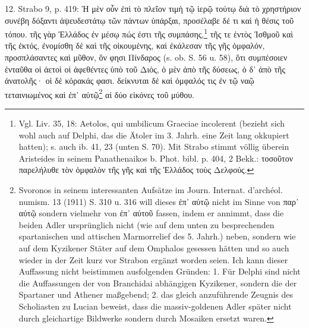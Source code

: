 \documentclass[a4paper, 11pt, oneside]{article}
\begin{document}
12. Strabo 9, p. 419: Ἡ μὲν οὖν ἐπὶ τὸ πλεῖον τιμὴ τῷ ἱερῷ τούτῳ διὰ τὸ χρηστήριον συνέβη δόξαντι ἀψευδεστάτῳ τῶν πάντων ὑπάρξαι, προσέλαβε δέ τι καὶ ἡ θέσις τοῦ τόπου. τῆς γὰρ Ἑλλάδος ἐν μέσῳ πώς ἐστι τῆς συμπάσης,\footnote{Vgl. Liv. 35, 18: Aetolos, qui umbilicum Graeciae incolerent (bezieht sich wohl auch auf Delphi, das die Ätoler im 3. Jahrh. eine Zeit lang okkupiert hatten); s. auch ib. 41, 23 (unten S. 70). Mit Strabo stimmt völlig überein Aristeides in seinem Panathenaikos b. Phot. bibl. p. 404, 2 Bekk.: τοσοῦτον παρελήλυθε τὸν ὀμφαλὸν τῆς γῆς καὶ τῆς Ἑλλάδος τοὺς Δελφούς.} τῆς τε ἐντὸς Ἰσθμοῦ καὶ τῆς ἐκτός, ἐνομίσθη δὲ καὶ τῆς οἰκουμένης, καὶ ἐκάλεσαν τῆς γῆς ὀμφαλόν, προσπλάσαντες καὶ μῦθον, ὃν φησι Πίνδαρος (s. ob. S. 56 u. 58), ὅτι συμπέσοιεν ἐνταῦθα οἱ ἀετοὶ οἱ ἀφεθέντες ὑπὸ τοῦ Διός, ὁ μὲν ἀπὸ τῆς δύσεως, ὁ δ᾽ ἀπὸ τῆς ἀνατολῆς· οἱ δὲ κόρακάς φασι. δείκνυται δὲ καὶ ὀμφαλός τις ἐν τῷ ναῷ τεταινιωμένος καὶ ἐπ᾽ αὐτῷ\footnote{Svoronos in seinem interessanten Aufsätze im Journ. Internat. d'archéol. numism. 13 (1911) S. 310 u. 316 will dieses ἐπ᾽ αὐτῷ nicht im Sinne von παρ᾽ αὐτῷ sondern vielmehr von ἐπ᾽ αὐτοῦ fassen, indem er annimmt, dass die beiden Adler ursprünglich nicht (wie auf dem unten zu besprechenden spartanischen und attischen Marmorrelief des 5. Jahrh.) neben, sondern wie auf dem Kyzikener Stäter auf dem Omphalos gesessen hätten und so auch wieder in der Zeit kurz vor Strabon ergänzt worden seien. Ich kann dieser Auffassung nicht beistimmen ausfolgenden Gründen: 1. Für Delphi sind nicht die Auffassungen der von Branchidai abhängigen Kyzikener, sondern die der Spartaner und Athener maßgebend; 2. das gleich anzuführende Zeugnis des Scholiasten zu Lucian beweist, dass die massiv-goldenen Adler später nicht durch gleichartige Bildwerke sondern durch Mosaiken ersetzt waren.} αἱ δύο εἰκόνες τοῦ μύθου.
\end{document}
